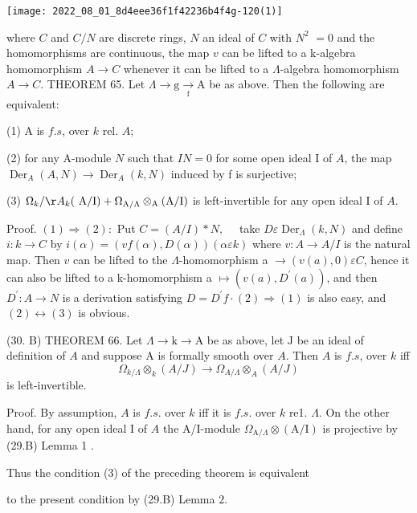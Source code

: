 \texttt{[image: 2022\_08\_01\_8d4eee36f1f42236b4f4g-120(1)]}

where $C$ and $C / N$ are discrete rings, $N$ an ideal of $C$ with $N^{2}$ $=0$ and the homomorphisms are continuous, the map $v$ can be lifted to a k-algebra homomorphism $A \rightarrow C$ whenever it can be lifted to a $\Lambda$-algebra homomorphism $A \rightarrow C$. THEOREM 65. Let $\Lambda \rightarrow \mathrm{g} \underset{\mathrm{f}}{\rightarrow} \mathrm{A}$ be as above. Then the following are equivalent:

(1) A is $f . s$, over $k$ rel. $A$;

(2) for any A-module $N$ such that $I N=0$ for some open ideal I of $A$, the map $\operatorname{Der}_{A}(A, N) \rightarrow \operatorname{Der}_{A}(k, N)$ induced by f is surjective;

(3) $\Omega_{k} / \AA_{k}(\mathrm{~A} / \mathrm{I})+\Omega_{\mathrm{A} / \Lambda} \otimes_{\mathrm{A}}(\mathrm{A} / \mathrm{I})$ is left-invertible for any open ideal I of $A$.

Proof. $(1) \Rightarrow(2):$ Put $C=(A / I) * N, \quad$ take $D \varepsilon \operatorname{Der}_{\Lambda}(k, N)$ and define $i: k \rightarrow C$ by $i(\alpha)=(v f(\alpha), D(\alpha))(\alpha \varepsilon k)$ where $v: A \rightarrow A / I$ is the natural map. Then $v$ can be lifted to the $\Lambda$-homomorphism a $\longrightarrow(v(a), 0) \varepsilon C$, hence it can also be lifted to a k-homomorphism a $\mapsto\left(v(a), D^{\prime}(a)\right)$, and then $D^{\prime}: A \rightarrow N$ is a derivation satisfying $D=D^{\prime} f \cdot(2) \Rightarrow(1)$ is also easy, and $(2) \leftrightarrow(3)$ is obvious.

(30. B) THEOREM 66. Let $\Lambda \rightarrow \mathrm{k} \rightarrow \mathrm{A}$ be as above, let $\mathrm{J}$ be an ideal of definition of $A$ and suppose A is formally smooth over $A$. Then $A$ is $f . s$, over $k$ iff
$$
\Omega_{k / \Lambda} \otimes_{k}(A / J) \rightarrow \Omega_{A / \Lambda} \otimes_{A}(A / J)
$$
is left-invertible.

Proof. By assumption, $A$ is $f . s$. over $k$ iff it is $f . s$. over $k$ re1. $\Lambda$. On the other hand, for any open ideal I of $A$ the A/I-module $\Omega_{\mathrm{A} / \Lambda} \otimes(\mathrm{A} / \mathrm{I})$ is projective by (29.B) Lemma 1 .

Thus the condition (3) of the preceding theorem is equivalent

to the present condition by (29.B) Lemma $2 .$

